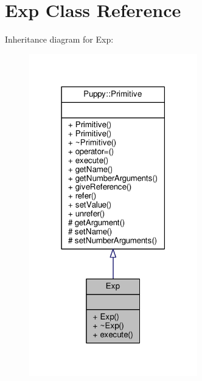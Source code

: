 \hypertarget{classExp}{}\section{Exp Class Reference}
\label{classExp}


Inheritance diagram for Exp\+:
\nopagebreak
\begin{figure}[H]
\begin{center}
\leavevmode
\includegraphics[width=207pt]{classExp__inherit__graph}
\end{center}
\end{figure}


